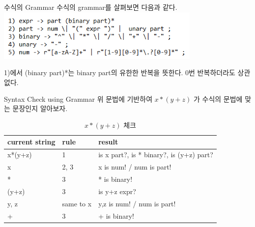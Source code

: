 \documentclass{beamer}
\begin{document}
 


\begin{frame}{수식의 Grammar} 
수식의 grammar를 살펴보면 다음과 같다. \\
\includegraphics[width=10cm,keepaspectratio]{grammar}

1)에서 (binary part)*는 binary part의 유한한 반복을 뜻한다. 0번 반복하더라도 상관없다. 

\end{frame}

\begin{frame}{Syntax Check using Grammar}
위 문법에 기반하여 $x*(y+z)$ 가 수식의 문법에 맞는 문장인지 알아보자. 

\begin{table}[]
\centering
\caption{$x*(y+z)$ 체크}
\label{my-label}
\begin{tabular}{|l|l|l|}
\hline
current string & rule & result \\ \hline
x*(y+z)&1    & is x part?, is * binary?, is (y+z) part?      \\ \hline
x &  2, 3 & x is num! / num is part!      \\ \hline
*& 3    & * is binary!      \\ \hline
(y+z)& 3    &  is y+z expr?      \\ \hline
y, z& same to x    &   y,z is num! / num is part!   \\ \hline
+ & 3    &  + is binary!     \\ \hline
\end{tabular}
\end{table}

\end{frame}
\end{document}
